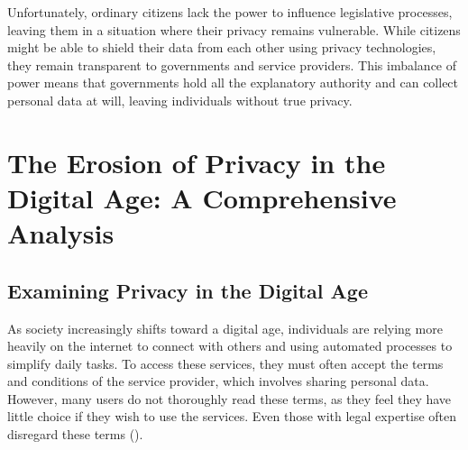 \documentclass[a4paper,12pt]{article}
\newcommand{\sectionpage}[1]{
  \newpage
  \section{#1}
  \doublespacing
  \singlespacing
}
\begin{document}
Unfortunately, ordinary citizens lack the power to influence legislative processes, leaving them in a situation where their privacy remains vulnerable. While citizens might be able to shield their data from each other using privacy technologies, they remain transparent to governments and service providers. This imbalance of power means that governments hold all the explanatory authority and can collect personal data at will, leaving individuals without true privacy.




\sectionpage{The Erosion of Privacy in the Digital Age: A Comprehensive Analysis}
\onehalfspacing

\subsection{Examining Privacy in the Digital Age}

As society increasingly shifts toward a digital age, individuals are relying more heavily on the internet to connect with others and using automated processes to simplify daily tasks. To access these services, they must often accept the terms and conditions of the service provider, which involves sharing personal data. However, many users do not thoroughly read these terms, as they feel they have little choice if they wish to use the services. Even those with legal expertise often disregard these terms (\cite{ibdah2021privacy}).
\end{document}
